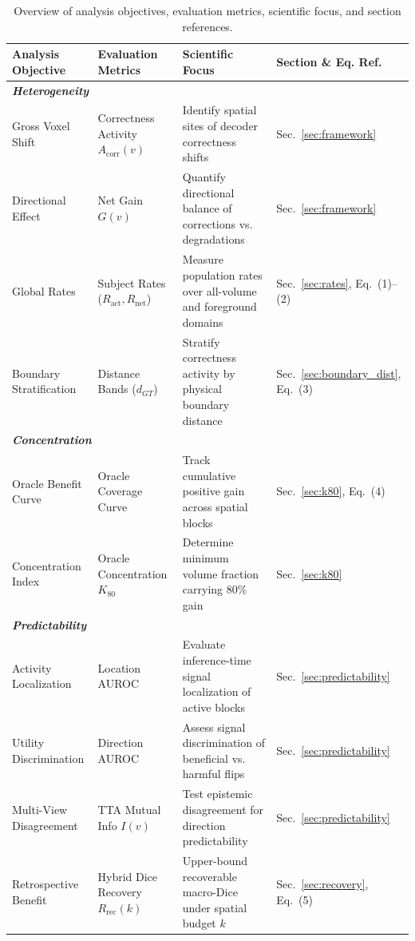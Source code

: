 \begin{table}[t]
\centering
\caption{Overview of analysis objectives, evaluation metrics, scientific focus, and section references.}
\label{tab:framework_summary}
\footnotesize
\begin{tabular*}{\textwidth}{@{\extracolsep{\fill}}llll}
\toprule
\textbf{Analysis Objective} & \textbf{Evaluation Metrics} & \textbf{Scientific Focus} & \textbf{Section \& Eq. Ref.} \\
\midrule
\multicolumn{4}{l}{\textit{\textbf{Heterogeneity}}} \\
Gross Voxel Shift & Correctness Activity $A_{\text{corr}}(v)$ & Identify spatial sites of decoder correctness shifts & Sec.~\ref{sec:framework} \\
Directional Effect & Net Gain $G(v)$ & Quantify directional balance of corrections vs. degradations & Sec.~\ref{sec:framework} \\
Global Rates & Subject Rates ($R_{\text{act}}, R_{\text{net}}$) & Measure population rates over all-volume and foreground domains & Sec.~\ref{sec:rates}, Eq.~(1)--(2) \\
Boundary Stratification & Distance Bands ($d_{GT}$) & Stratify correctness activity by physical boundary distance & Sec.~\ref{sec:boundary_dist}, Eq.~(3) \\
\midrule
\multicolumn{4}{l}{\textit{\textbf{Concentration}}} \\
Oracle Benefit Curve & Oracle Coverage Curve & Track cumulative positive gain across spatial blocks & Sec.~\ref{sec:k80}, Eq.~(4) \\
Concentration Index & Oracle Concentration $K_{80}$ & Determine minimum volume fraction carrying $80\%$ gain & Sec.~\ref{sec:k80} \\
\midrule
\multicolumn{4}{l}{\textit{\textbf{Predictability}}} \\
Activity Localization & Location AUROC & Evaluate inference-time signal localization of active blocks & Sec.~\ref{sec:predictability} \\
Utility Discrimination & Direction AUROC & Assess signal discrimination of beneficial vs. harmful flips & Sec.~\ref{sec:predictability} \\
Multi-View Disagreement & TTA Mutual Info $I(v)$ & Test epistemic disagreement for direction predictability & Sec.~\ref{sec:predictability} \\
Retrospective Benefit & Hybrid Dice Recovery $R_{\text{rec}}(k)$ & Upper-bound recoverable macro-Dice under spatial budget $k$ & Sec.~\ref{sec:recovery}, Eq.~(5) \\
\bottomrule
\end{tabular*}
\end{table}

